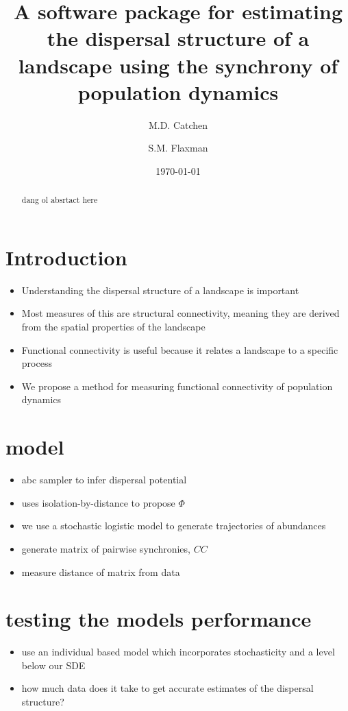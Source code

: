 \documentclass[]{article}
\title{A software package for estimating the dispersal structure of a landscape using the synchrony of population dynamics \\}
\author[1,2]{M.D. Catchen}
\author[1]{S.M. Flaxman}
\affil[1]{\small{Department of Ecology and Evolutionary Biology, University of Colorado at Boulder}}
\affil[2]{\small{Department of Biology, McGill University}}
\date{\today}
\begin{document}
\maketitle
\begin{abstract}

dang ol absrtact here

\end{abstract}
\clearpage
\tableofcontents
\clearpage
\section{Introduction}

\begin{itemize}
    \item Understanding the dispersal structure of a landscape is important
    \item Most measures of this are structural connectivity, meaning they are derived from the spatial properties of the landscape
    \item Functional connectivity is useful because it relates a landscape to a specific process
    \item We propose a method for measuring functional connectivity of population dynamics
\end{itemize}

\section{model}

\begin{itemize}
    \item abc sampler to infer dispersal potential
    \item uses isolation-by-distance to propose $\Phi$
    \item we use a stochastic logistic model to generate trajectories of abundances
    \item generate matrix of pairwise synchronies, $CC$
    \item measure distance of matrix from data 
\end{itemize}


\section{testing the models performance}

\begin{itemize}
    \item use an individual based model which incorporates stochasticity and a level below our SDE
    \item how much data does it take to get accurate estimates of the dispersal structure? 
\end{itemize}
\end{document}
